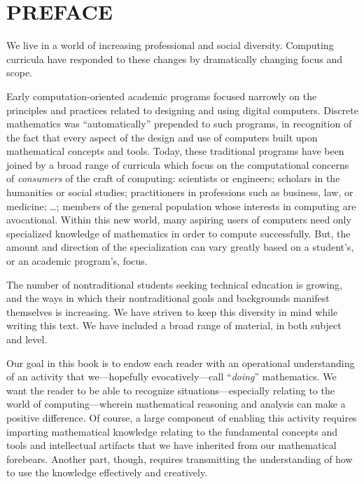 
\chapter*{PREFACE}

We live in a world of increasing professional and social diversity.
Computing curricula have responded to these changes by dramatically
changing focus and scope.

Early computation-oriented academic programs focused narrowly on the
principles and practices related to designing and using digital
computers.  Discrete mathematics was ``automatically'' prepended to
such programs, in recognition of the fact that every aspect of the
design and use of computers built upon mathematical concepts and
tools.  Today, these traditional programs have been joined by a broad
range of curricula which focus on the computational concerns of {\em
  consumers} of the craft of computing: scientists or engineers;
scholars in the humanities or social studies; practitioners in
professions such as business, law, or medicine; \ldots; members of the
general population whose interests in computing are avocational.
Within this new world, many aspiring users of computers need only
specialized knowledge of mathematics in order to compute successfully.
But, the amount and direction of the specialization can vary greatly
based on a student's, or an academic program's, focus.

\medskip

The number of nontraditional students seeking technical education is
growing, and the ways in which their nontraditional goals and
backgrounds manifest themselves is increasing.  We have striven to
keep this diversity in mind while writing this text.  We have included
a broad range of material, in both subject and level.

\bigskip

Our goal in this book is to endow each reader with an operational
understanding of an activity that we---hopefully evocatively---call
``{\em doing}'' mathematics.  We want the reader to be able to
recognize situations---especially relating to the world of
computing---wherein mathematical reasoning and analysis can make a
positive difference.  Of course, a large component of enabling this
activity requires imparting mathematical knowledge relating to the
fundamental concepts and tools and intellectual artifacts that we have
inherited from our mathematical forebears.  Another part, though,
requires transmitting the understanding of how to use the knowledge
effectively and creatively.

